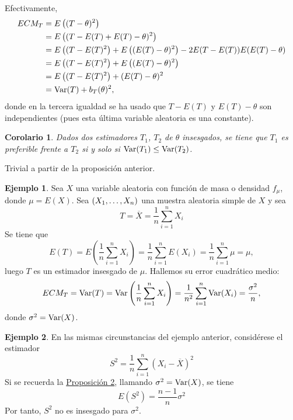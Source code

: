 \documentclass[11pt]{report}
\makeatletter
\renewenvironment{proof}[1][\proofname]{\par
  \pushQED{\qed}%
  \normalfont \topsep\z@skip %
  \trivlist
  \item[\hskip\labelsep
        \itshape
    #1\@addpunct{.}]\ignorespaces
}{%
  \popQED\endtrivlist\@endpefalse
}
\newtheorem{corollary}{Corolario} %
\theoremstyle{definition}
\newtheorem{example}{Ejemplo}
\makeatother
\begin{document}
\begin{proof}
Efectivamente,
\[
\begin{aligned}[t]
ECM_T&=E\left((T-\theta)^2\right)\\&=E\left((T-E(T)+E(T)-\theta)^2\right) \\
&= E\left((T-E(T)^2\right)+E\left((E(T)-\theta)^2\right)-2E(T-E(T))E(E(T)-\theta) \\ &=  E\left((T-E(T)^2\right)+E\left((E(T)-\theta)^2\right) \\ &= E\left((T-E(T)^2\right)+(E(T)-\theta)^2 \\
&=\textup{Var}(T)+b_T(\theta)^2,
\end{aligned}
\]
donde en la tercera igualdad se ha usado que $T-E(T)$ y $E(T)-\theta$ son independientes (pues esta última variable aleatoria es una constante).
\end{proof}
    
\begin{corollary}
Dados dos estimadores $T_1$, $T_2$ de $\theta$ insesgados, se tiene que $T_1$ es preferible frente a $T_2$ si y solo si $\textup{Var}(T_1) \leq \textup{Var}(T_2)$.
\end{corollary}

\begin{proof}
Trivial a partir de la proposición anterior.
\end{proof}

\begin{example}
Sea $X$ una variable aleatoria con función de masa o densidad $f_\mu$, donde $\mu = E(X)$. Sea $(X_1,\mathellipsis,X_n)$ una muestra aleatoria simple de $X$ y sea
\[T=\overline{X}=\frac{1}{n}\sum_{i=1}^n X_i\]
Se tiene que
\[E(T)= E\left(\frac{1}{n}\sum_{i=1}^n X_i\right)=\frac{1}{n}\sum_{i=1}^nE(X_i)=\frac{1}{n}\sum_{i=1}^n\mu= \mu,\]
luego $T$ es un estimador insesgado de $\mu$. Hallemos su error cuadrático medio:
\[ECM_T = \textup{Var}(T) = \textup{Var}\left(\frac{1}{n}\sum_{i=1}^n X_i\right) = \frac{1}{n^2}\sum_{i=1}^n\textup{Var}(X_i) = \frac{\sigma^2}{n},\]
donde $\sigma^2 = \textup{Var}(X)$.
\end{example}

\begin{example}
En las mismas circunstancias del ejemplo anterior, considérese el estimador
\[S^2=\frac{1}{n}\sum_{i=1}^n(X_i-\overline{X})^2\]
Si se recuerda la \hyperref[prop1.10]{\color{blue}Proposición 2}, llamando $\sigma^2 = \textup{Var}(X)$, se tiene
\[E(S^2)=\frac{n-1}{n}\sigma^2\]
Por tanto, $S^2$ no es insesgado para $\sigma^2$.
\end{example}
\end{document}

